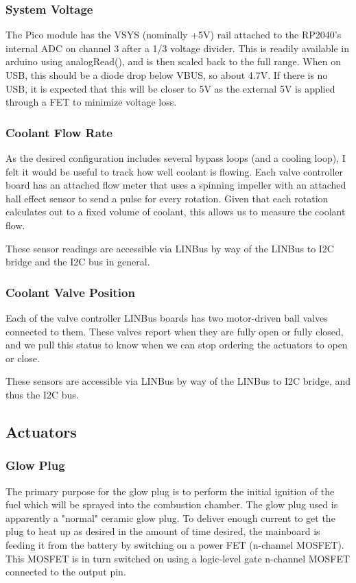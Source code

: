 \documentclass[lettersize,journal]{IEEEtran}
\begin{document}
\subsubsection{System Voltage}
The Pico module has the VSYS (nominally +5V) rail attached to the RP2040's internal ADC on channel 3 after a 1/3 voltage divider.  This is readily available in arduino using analogRead(), and is then scaled back to the full range.  When on USB, this should be a diode drop below VBUS, so about 4.7V.  If there is no USB, it is expected that this will be closer to 5V as the external 5V is applied through a FET to minimize voltage loss. 

\subsubsection{Coolant Flow Rate}
As the desired configuration includes several bypass loops (and a cooling loop), I felt it would be useful to track how well coolant is flowing.  Each valve controller board has an attached flow meter that uses a spinning impeller with an attached hall effect sensor to send a pulse for every rotation.  Given that each rotation calculates out to a fixed volume of coolant, this allows us to measure the coolant flow.

These sensor readings are accessible via LINBus by way of the LINBus to I2C bridge and the I2C bus in general.

\subsubsection{Coolant Valve Position}
Each of the valve controller LINBus boards has two motor-driven ball valves connected to them.  These valves report when they are fully open or fully closed, and we pull this status to know when we can stop ordering the actuators to open or close. 

These sensors are accessible via LINBus by way of the LINBus to I2C bridge, and thus the I2C bus.


\subsection{Actuators}
\subsubsection{Glow Plug}
The primary purpose for the glow plug is to perform the initial ignition of the fuel which will be sprayed into the combustion chamber.  The glow plug used is apparently a "normal" ceramic glow plug.  To deliver enough current to get the plug to heat up as desired in the amount of time desired, the mainboard is feeding it from the battery by switching on a power FET (n-channel MOSFET).  This MOSFET is in turn switched on using a logic-level gate n-channel MOSFET connected to the output pin.
\end{document}
